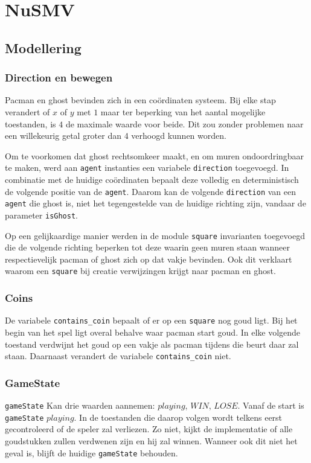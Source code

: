 \documentclass[a4paper,12pt]{article}
\begin{document}
\section{NuSMV}

\subsection{Modellering}

\subsubsection{Direction en bewegen}
Pacman en ghost bevinden zich in een co\"ordinaten systeem.
Bij elke stap verandert of $ x $ of $ y $ met $ 1 $
maar ter beperking van het aantal mogelijke toestanden, is $ 4 $ de maximale waarde voor beide.
Dit zou zonder problemen naar een willekeurig getal groter dan $ 4 $ verhoogd kunnen worden.

Om te voorkomen dat ghost rechtsomkeer maakt, 
en om muren ondoordringbaar te maken,
werd aan \texttt{agent} instanties een variabele \texttt{direction} toegevoegd.
In combinatie met de huidige co\"ordinaten bepaalt deze volledig en deterministisch de volgende positie van de \texttt{agent}.
Daarom kan de volgende \texttt{direction} van een \texttt{agent} die ghost is,
niet het tegengestelde van de huidige richting zijn, vandaar de parameter \texttt{isGhost}.

Op een gelijkaardige manier werden in de module \texttt{square} invarianten toegevoegd
die de volgende richting beperken tot deze waarin geen muren staan
wanneer respectievelijk pacman of ghost zich op dat vakje bevinden.
Ook dit verklaart waarom een \texttt{square} bij creatie verwijzingen krijgt naar pacman en ghost.

\subsubsection{Coins}
De variabele \texttt{contains\_coin} bepaalt of er op een \texttt{square} nog goud ligt.
Bij het begin van het spel ligt overal behalve waar pacman start goud.
In elke volgende toestand verdwijnt het goud op een vakje als pacman tijdens die beurt daar zal staan.
Daarnaast verandert de variabele \texttt{contains\_coin} niet.

\subsubsection{GameState}
\texttt{gameState} Kan drie waarden aannemen: $ playing $, $ WIN $, $ LOSE $.
Vanaf de start is \texttt{gameState} $ playing $.
In de toestanden die daarop volgen wordt telkens eerst gecontroleerd of de speler zal verliezen.
Zo niet, kijkt de implementatie of alle goudstukken zullen verdwenen zijn en hij zal winnen.
Wanneer ook dit niet het geval is, blijft de huidige \texttt{gameState} behouden.
\end{document}
